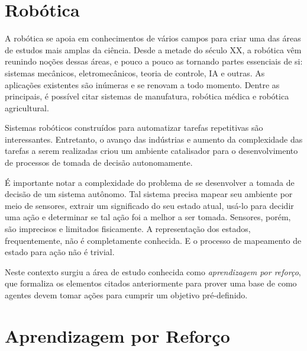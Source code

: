 \section{Robótica}
\par A robótica se apoia em conhecimentos de vários campos para criar uma das áreas de estudos mais amplas da ciência. Desde a metade do século XX, a robótica vêm reunindo noções dessas áreas, e pouco a pouco as tornando partes essenciais de si: sistemas mecânicos, eletromecânicos, teoria de controle, IA e outras. As aplicações existentes são inúmeras e se renovam a todo momento. Dentre as principais, é possível citar sistemas de manufatura, robótica médica e robótica agricultural. \cite{handbook2007} 
\par Sistemas robóticos construídos para automatizar tarefas repetitivas são interessantes. Entretanto, o avanço das indústrias e aumento da complexidade das tarefas a serem realizadas criou um ambiente catalisador para o desenvolvimento de processos de tomada de decisão autonomamente. 
\par É importante notar a complexidade do problema de se desenvolver a tomada de decisão de um sistema autônomo. Tal sistema precisa mapear seu ambiente por meio de sensores, extrair um significado do seu estado atual, usá-lo para decidir uma ação e determinar se tal ação foi a melhor a ser tomada. Sensores, porém, são imprecisos e limitados fisicamente. A representação dos estados, frequentemente, não é completamente conhecida. E o processo de mapeamento de estado para ação não é trivial.
\par Neste contexto surgiu a área de estudo conhecida como \textit{aprendizagem por reforço}, que formaliza os elementos citados anteriormente para prover uma base de como agentes devem tomar ações para cumprir um objetivo pré-definido. \cite{sutton2018reinforcement}


\section{Aprendizagem por Reforço}
\par 

